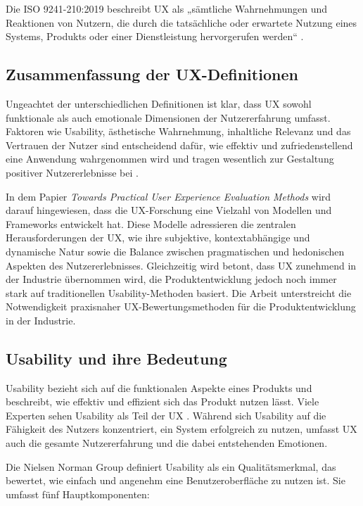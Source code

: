\documentclass[12pt,oneside]{article}
\begin{document}
Die ISO 9241-210:2019 beschreibt UX als „sämtliche Wahrnehmungen und Reaktionen von Nutzern, die durch die tatsächliche oder erwartete Nutzung eines Systems, Produkts oder einer Dienstleistung hervorgerufen werden“ \cite{ISO}.

\subsection{Zusammenfassung der UX-Definitionen}

Ungeachtet der unterschiedlichen Definitionen ist klar, dass UX sowohl funktionale als auch emotionale Dimensionen der Nutzererfahrung umfasst. Faktoren wie Usability, ästhetische Wahrnehmung, inhaltliche Relevanz und das Vertrauen der Nutzer sind entscheidend dafür, wie effektiv und zufriedenstellend eine Anwendung wahrgenommen wird und tragen wesentlich zur Gestaltung positiver Nutzererlebnisse bei \cite{toolbox}.

In dem Papier \textit{Towards Practical User Experience Evaluation Methods} \cite{evaluationmethods} wird darauf hingewiesen, dass die UX-Forschung eine Vielzahl von Modellen und Frameworks entwickelt hat. Diese Modelle adressieren die zentralen Herausforderungen der UX, wie ihre subjektive, kontextabhängige und dynamische Natur sowie die Balance zwischen pragmatischen und hedonischen Aspekten des Nutzererlebnisses. Gleichzeitig wird betont, dass UX zunehmend in der Industrie übernommen wird, die Produktentwicklung jedoch noch immer stark auf traditionellen Usability-Methoden basiert. Die Arbeit unterstreicht die Notwendigkeit praxisnaher UX-Bewertungsmethoden für die Produktentwicklung in der Industrie.

\subsection{Usability und ihre Bedeutung}

Usability bezieht sich auf die funktionalen Aspekte eines Produkts und beschreibt, wie effektiv und effizient sich das Produkt nutzen lässt. Viele Experten sehen Usability als Teil der UX \cite{GOISTAI}. Während sich Usability auf die Fähigkeit des Nutzers konzentriert, ein System erfolgreich zu nutzen, umfasst UX auch die gesamte Nutzererfahrung und die dabei entstehenden Emotionen.

Die Nielsen Norman Group definiert Usability als ein Qualitätsmerkmal, das bewertet, wie einfach und angenehm eine Benutzeroberfläche zu nutzen ist. Sie umfasst fünf Hauptkomponenten:
\end{document}
